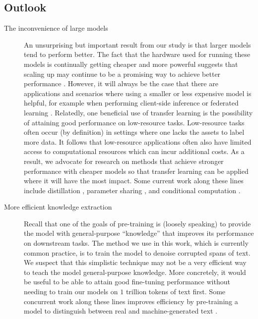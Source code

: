 \documentclass[twoside,11pt]{article}
\begin{document}
\subsection{Outlook}

\begin{description}

\item[The inconvenience of large models] An unsurprising but important result from our study is that larger models tend to perform better.
The fact that the hardware used for running these models is continually getting cheaper and more powerful suggests that scaling up may continue to be a promising way to achieve better performance \citep{sutton2019bitter}.
However, it will always be the case that there are applications and scenarios where using a smaller or less expensive model is helpful, for example when performing client-side inference or federated learning \citep{konevcny2015federated,konevcny2016federated}.
Relatedly, one beneficial use of transfer learning is the possibility of attaining good performance on low-resource tasks.
Low-resource tasks often occur (by definition) in settings where one lacks the assets to label more data.
It follows that low-resource applications often also have limited access to computational resources which can incur additional costs.
As a result, we advocate for research on methods that achieve stronger performance with cheaper models so that transfer learning can be applied where it will have the most impact.
Some current work along these lines include distillation \citep{hinton2015distilling,sanh2019distilbert,jiao2019tinybert}, parameter sharing \citep{lan2019albert}, and conditional computation \citep{shazeer2017outrageously}.

\item[More efficient knowledge extraction] Recall that one of the goals of pre-training is (loosely speaking) to provide the model with general-purpose ``knowledge'' that improves its performance on downstream tasks.
The method we use in this work, which is currently common practice, is to train the model to denoise corrupted spans of text.
We suspect that this simplistic technique may not be a very efficient way to teach the model general-purpose knowledge.
More concretely, it would be useful to be able to attain good fine-tuning performance without needing to train our models on $1$ trillion tokens of text first.
Some concurrent work along these lines improves efficiency by pre-training a model to distinguish between real and machine-generated text \citep{clark2020electra}.


\end{description}
\end{document}
